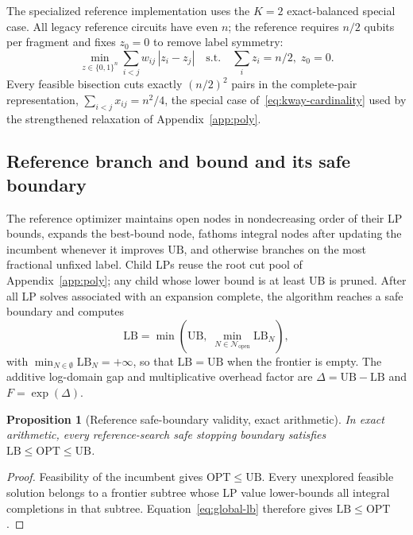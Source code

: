 \documentclass[
  aps,
  pra,
  reprint,
  amsmath,
  amssymb,
  longbibliography,
  nofootinbib,
  floatfix
]{revtex4-2}
\theoremstyle{plain}
\newtheorem{proposition}{Proposition}
\newcommand{\OPT}{\mathrm{OPT}}
\newcommand{\LB}{\mathrm{LB}}
\newcommand{\UB}{\mathrm{UB}}
\newcommand{\gap}{\Delta}
\begin{document}
The specialized reference implementation uses the $K=2$ exact-balanced special case. All legacy reference circuits have even $n$; the reference requires $n/2$ qubits per fragment and fixes $z_0=0$ to remove label symmetry:
\begin{equation}
  \min_{z \in \{0,1\}^n} \sum_{i<j} w_{ij}\,|z_i - z_j|
  \quad \text{s.t.} \quad \textstyle\sum_i z_i = n/2,\; z_0 = 0.
  \label{eq:balanced}
\end{equation}
Every feasible bisection cuts exactly $(n/2)^2$ pairs in the complete-pair representation, $\sum_{i<j}x_{ij}=n^2/4$, the special case of~\eqref{eq:kway-cardinality} used by the strengthened relaxation of Appendix~\ref{app:poly}.

\subsection{Reference branch and bound and its safe boundary}

The reference optimizer maintains open nodes in nondecreasing order of their LP bounds, expands the best-bound node, fathoms integral nodes after updating the incumbent whenever it improves $\UB$, and otherwise branches on the most fractional unfixed label. Child LPs reuse the root cut pool of Appendix~\ref{app:poly}; any child whose lower bound is at least $\UB$ is pruned. After all LP solves associated with an expansion complete, the algorithm reaches a safe boundary and computes
\begin{equation}
  \LB = \min\!\left(\UB,\; \min_{N \in \mathcal{N}_{\mathrm{open}}} \LB_N\right),
  \label{eq:global-lb}
\end{equation}
with $\min_{N\in\emptyset}\LB_N=+\infty$, so that $\LB=\UB$ when the frontier is empty. The additive log-domain gap and multiplicative overhead factor are $\gap=\UB-\LB$ and $F=\exp(\gap)$.

\begin{proposition}[Reference safe-boundary validity, exact arithmetic]\label{prop:safe-boundary}
In exact arithmetic, every reference-search safe stopping boundary satisfies $\LB\leq\OPT\leq\UB$.
\end{proposition}
\begin{proof}
Feasibility of the incumbent gives $\OPT\leq\UB$. Every unexplored feasible solution belongs to a frontier subtree whose LP value lower-bounds all integral completions in that subtree. Equation~\eqref{eq:global-lb} therefore gives $\LB\leq\OPT$.
\end{proof}
\end{document}
